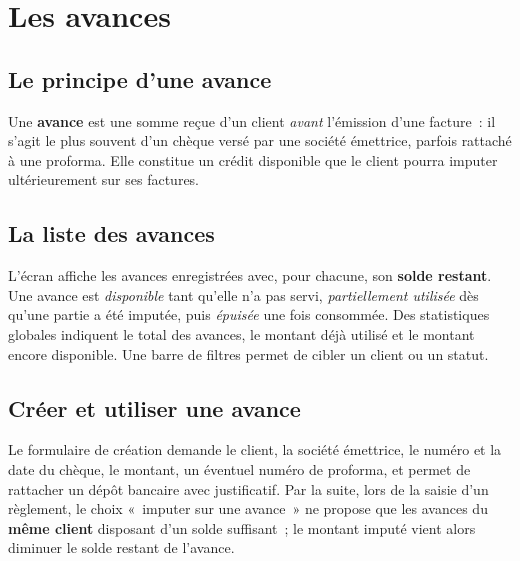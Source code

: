 \chapter{Les avances}

\section{Le principe d'une avance}
Une \textbf{avance} est une somme reçue d'un client \emph{avant} l'émission d'une facture~: il s'agit le plus souvent d'un chèque versé par une société émettrice, parfois rattaché à une proforma. Elle constitue un crédit disponible que le client pourra imputer ultérieurement sur ses factures.

\section{La liste des avances}
L'écran  affiche les avances enregistrées avec, pour chacune, son \textbf{solde restant}. Une avance est \emph{disponible} tant qu'elle n'a pas servi, \emph{partiellement utilisée} dès qu'une partie a été imputée, puis \emph{épuisée} une fois consommée. Des statistiques globales indiquent le total des avances, le montant déjà utilisé et le montant encore disponible. Une barre de filtres permet de cibler un client ou un statut.

\section{Créer et utiliser une avance}
Le formulaire de création demande le client, la société émettrice, le numéro et la date du chèque, le montant, un éventuel numéro de proforma, et permet de rattacher un dépôt bancaire avec justificatif. Par la suite, lors de la saisie d'un règlement, le choix «~imputer sur une avance~» ne propose que les avances du \textbf{même client} disposant d'un solde suffisant~; le montant imputé vient alors diminuer le solde restant de l'avance.

